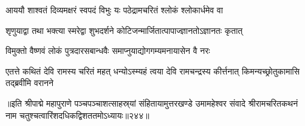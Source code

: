 \twolineshloka
{आययौ शाश्वतं दिव्यमक्षरं स्वपदं विभुः}
{यः पठेद्रामचरितं श्लोकं श्लोकार्धमेव वा}%

\twolineshloka
{शृणुयाद्वा तथा भक्त्या स्मरेद्वा शुभदर्शने}
{कोटिजन्मार्जितात्पापाज्ज्ञानतोऽज्ञानतः कृतात्}%

\twolineshloka
{विमुक्तो वैष्णवं लोकं पुत्रदारसबान्धवैः}
{समाप्नुयाद्योगगम्यमनायासेन वै नरः}%


\onelineshloka
{एतत्ते कथितं देवि रामस्य चरितं महत्}
{धन्योऽस्म्यहं त्वया देवि रामचन्द्रस्य कीर्त्तनात्}
{किमन्यच्छ्रोतुकामासि तद्ब्रवीमि वरानने}%

{॥इति श्रीपाद्मे महापुराणे पञ्चपञ्चाशत्साहस्र्यां संहितायामुत्तरखण्डे उमामहेश्वर संवादे श्रीरामचरितकथनं नाम चतुश्चत्वारिंशदधिकद्विशततमोऽध्यायः॥२४४॥}


